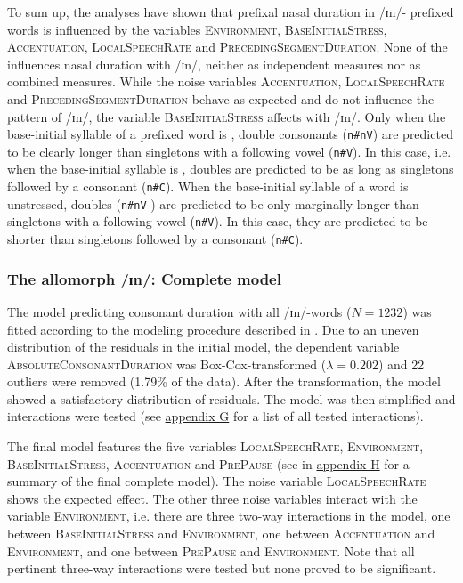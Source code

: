 To sum up, the analyses have shown that prefixal nasal duration in /ɪn/- prefixed words is influenced by the variables \textsc{Environment}, \textsc{BaseInitialStress}, \textsc{Accentuation}, \textsc{LocalSpeechRate} and \textsc{PrecedingSegmentDuration}. None of the  influences nasal duration with /ɪn/, neither as independent measures nor as combined measures. 
While the noise variables \textsc{Accentuation}, \textsc{LocalSpeechRate} and \textsc{PrecedingSegmentDuration} behave as expected and do not influence the  pattern of /ɪn/, the variable \textsc{BaseInitialStress} affects  with /ɪn/. 
Only when the base-initial syllable of a prefixed word is , double consonants (\texttt{n\#nV}) are predicted to be clearly longer than singletons with a following vowel (\texttt{n\#V}). In this case, i.e. when the base-initial syllable is , doubles are predicted to be as long as singletons followed by a consonant (\texttt{n\#C}). When the base-initial syllable of a word is unstressed, doubles (\texttt{n\#nV} ) are predicted to be only marginally longer than singletons with a following vowel (\texttt{n\#V}). In this case, they are predicted to be shorter than singletons followed by a consonant (\texttt{n\#C}).

\subsubsection{The allomorph /ɪn/: Complete model}


The model predicting consonant duration with all /ɪn/-words ($N=1232$) was fitted according to the modeling procedure described in . Due to an uneven distribution of the residuals in the initial model, the dependent variable \textsc{AbsoluteConsonantDuration} was Box-Cox-transformed ($\lambda = 0.202$) and 22 outliers were removed (1.79\% of the data). 
After the transformation, the model showed a satisfactory distribution of residuals. The model was then simplified and interactions were tested (see \hyperref[Appendix G Summaries of tested interactions in experimental study]{appendix G} for a list of all tested interactions).




The final model features the five variables \textsc{LocalSpeechRate}, \textsc{Environment}, \textsc{BaseInitialStress}, \textsc{Accentuation} and \textsc{PrePause} (see  in \hyperref[Appendix H: Model Summaries Experiment]{appendix H} for a summary of the final complete model). 
The noise variable \textsc{LocalSpeechRate} shows the expected effect. The other three noise variables interact with the variable \textsc{Environment}, i.e. there are three two-way interactions in the model, one between \textsc{BaseInitialStress} and \textsc{Environment}, one between \textsc{Accentuation} and \textsc{Environment}, and one between \textsc{PrePause} and \textsc{Environment}.  Note that all pertinent three-way interactions were tested but none proved to be significant.


